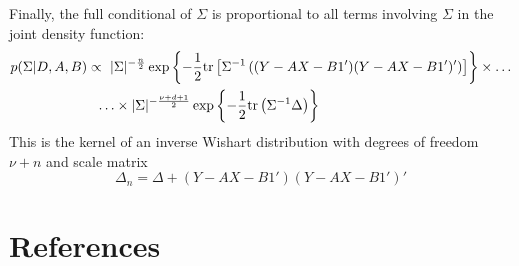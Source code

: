 \documentclass{article} %
\begin{document}
Finally, the full conditional of $\Sigma$ is proportional to all terms involving $\Sigma$ in the joint density function:
\begin{align*}
p(\Sigma|D,A,B)&\propto\ \vert\Sigma\vert^{-\frac{n}{2}}\exp\left\{-\frac{1}{2}\tr\left[\Sigma^{-1}\left((Y-AX-B1')(Y-AX-B1')'\right)\right]\right\}\times\ldots\\
&~~\ldots\times\vert\Sigma\vert^{-\frac{\nu+d+1}{2}}\exp\left\{-\frac{1}{2}\tr\left(\Sigma^{-1}\Delta\right)\right\}
\end{align*}
This is the kernel of an inverse Wishart distribution with degrees of freedom $\nu+n$ and scale matrix
\[\Delta_n=\Delta+(Y-AX-B1')(Y-AX-B1')'\]

\clearpage
\section{References}


\end{document}
